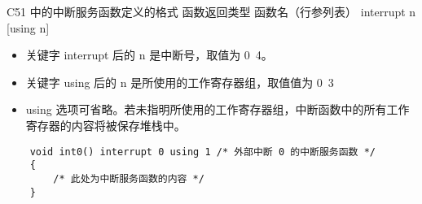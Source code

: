 \documentclass{beamer}
\begin{document}
\begin{frame}[fragile]{C51 中的中断服务函数定义的格式}
    函数返回类型 函数名（行参列表） interrupt n [using n]

    \begin{itemize}
        \item 关键字 interrupt 后的 n 是中断号，取值为 0~4。
        \item 关键字 using 后的 n 是所使用的工作寄存器组，取值值为 0~3
        \item using 选项可省略。若未指明所使用的工作寄存器组，中断函数中的所有工作寄存器的内容将被保存堆栈中。
    \end{itemize}

    \begin{lstlisting}
    void int0() interrupt 0 using 1 /* 外部中断 0 的中断服务函数 */
    {
        /* 此处为中断服务函数的内容 */
    }
    \end{lstlisting}

\end{frame}
\end{document}

